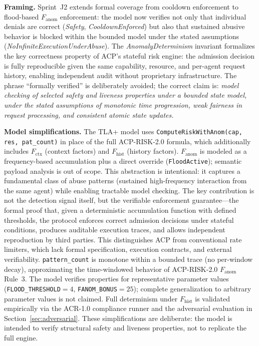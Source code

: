 \documentclass[11pt]{article}
\theoremstyle{definition}
\begin{document}
\noindent\textbf{Framing.}
Sprint~J2 extends formal coverage from cooldown enforcement to flood-based
$F_{\text{anom}}$ enforcement: the model now verifies not only that individual denials
are correct (\textit{Safety}, \textit{CooldownEnforced}) but also that sustained abusive
behavior is blocked within the bounded model under the stated assumptions
(\textit{NoInfiniteExecutionUnderAbuse}).
The \textit{AnomalyDeterminism} invariant formalizes the key correctness property of
ACP's stateful risk engine: the admission decision is fully reproducible given the same
capability, resource, and per-agent request history, enabling independent audit without
proprietary infrastructure.
The phrase ``formally verified'' is deliberately avoided; the correct claim is:
\emph{model checking of selected safety and liveness properties under a bounded state model,
under the stated assumptions of monotonic time progression, weak fairness in request
processing, and consistent atomic state updates.}

\noindent\textbf{Model simplifications.}
The TLA+ model uses \texttt{ComputeRiskWithAnom(cap,\,res,\,pat\_count)} in place of the
full ACP-RISK-2.0 formula, which additionally includes $F_{\text{ctx}}$ (context factors)
and $F_{\text{hist}}$ (history factors).
$F_{\text{anom}}$ is modeled as a frequency-based accumulation plus a direct override
(\texttt{FloodActive}); semantic payload analysis is out of scope.
This abstraction is intentional: it captures a fundamental class of abuse patterns
(sustained high-frequency interaction from the same agent) while enabling tractable
model checking.
The key contribution is not the detection signal itself, but the verifiable enforcement
guarantee---the formal proof that, given a deterministic accumulation function with
defined thresholds, the protocol enforces correct admission decisions under stateful
conditions, produces auditable execution traces, and allows independent reproduction
by third parties.
This distinguishes ACP from conventional rate limiters, which lack formal specification,
execution contracts, and external verifiability.
\texttt{pattern\_count} is monotone within a bounded trace (no per-window decay),
approximating the time-windowed behavior of ACP-RISK-2.0 $F_{\text{anom}}$ Rule~3.
The model verifies properties for representative parameter values
(\texttt{FLOOD\_THRESHOLD}$=4$, \texttt{FANOM\_BONUS}$=25$);
complete generalization to arbitrary parameter values is not claimed.
Full determinism under $F_{\text{hist}}$ is validated empirically via the ACR-1.0
compliance runner and the adversarial evaluation in Section~\ref{sec:adversarial}.
These simplifications are deliberate: the model is intended to verify structural
safety and liveness properties, not to replicate the full engine.
\end{document}
